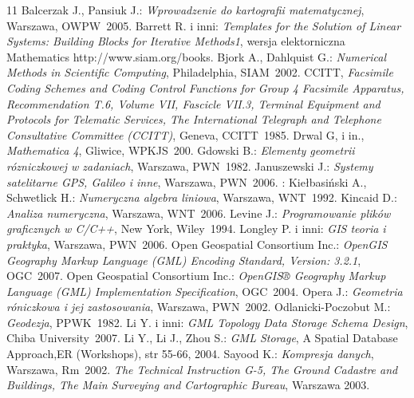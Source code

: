 
\setcounter{secnumdepth}{-1}




%
%

\begin {thebibliography}{11}
 Balcerzak J., Pansiuk J.: \emph{Wprowadzenie do kartografii matematycznej}, Warszawa, OWPW~2005.
 Barrett R. i inni: \emph{Templates for the Solution of Linear Systems: Building Blocks for Iterative Methods1}, wersja elektorniczna Mathematics http://www.siam.org/books.
 Bjork A., Dahlquist G.: \emph{Numerical Methods in Scientific Computing}, Philadelphia, SIAM~2002.
CCITT, \emph{Facsimile Coding Schemes and Coding Control Functions for Group 4 Facsimile
Apparatus, Recommendation T.6, Volume VII, Fascicle VII.3, Terminal Equipment and
Protocols for Telematic Services, The International Telegraph and Telephone Consultative Committee (CCITT)}, Geneva, CCITT~1985.
 Drwal G, i in., \emph{Mathematica 4}, Gliwice, WPKJS~200.
 Gdowski B.: \emph{Elementy geometrii rózniczkowej w zadaniach}, Warszawa, PWN~1982.
 Januszewski J.: \emph{Systemy satelitarne GPS, Galileo i inne}, Warszawa, PWN~2006.
: Kiełbasiński A., Schwetlick H.: \emph{Numeryczna algebra liniowa}, Warszawa, WNT~1992.
 Kincaid D.: \emph{Analiza numeryczna}, Warszawa, WNT~2006.
 Levine J.: \emph{Programowanie plików graficznych w C/C++}, New York, Wiley~1994.
 Longley P. i inni: \emph{GIS teoria i praktyka}, Warszawa, PWN~2006.
 Open Geospatial Consortium Inc.: \emph{OpenGIS Geography Markup Language (GML) Encoding Standard, Version: 3.2.1},  OGC~2007.
 Open Geospatial Consortium Inc.: \emph{OpenGIS® Geography Markup Language (GML) Implementation Specification}, OGC~2004.
 Opera J.: \emph{Geometria róniczkowa i jej zastosowania}, Warszawa, PWN~2002.
 Odlanicki-Poczobut M.: \emph{Geodezja}, PPWK~1982.
Li Y. i inni: \emph{GML Topology Data Storage Schema Design}, Chiba University~2007.
Li Y., Li J., Zhou S.: \emph{GML Storage}, A Spatial Database Approach,ER (Workshops), str 55-66, 2004.
 Sayood K.: \emph{Kompresja danych}, Warszawa, Rm~2002.
 \emph{The Technical Instruction G-5, The Ground Cadastre and Buildings, The Main Surveying and
Cartographic Bureau}, Warszawa 2003.



\end {thebibliography}



